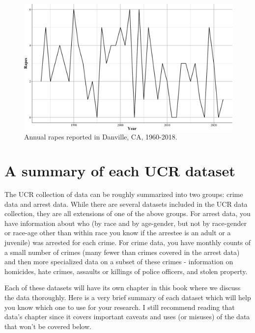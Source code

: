 \documentclass[
  12pt,
  openany]{book}
\begin{document}
\begin{figure}

{\centering \includegraphics[width=0.9\linewidth]{ucrbook_files/figure-latex/danvilleRape-1} 

}

\caption{Annual rapes reported in Danville, CA, 1960-2018.}\label{fig:danvilleRape}
\end{figure}

\hypertarget{a-summary-of-each-ucr-dataset}{%
\section{A summary of each UCR dataset}\label{a-summary-of-each-ucr-dataset}}

The UCR collection of data can be roughly summarized into two groups: crime data and arrest data. While there are several datasets included in the UCR data collection, they are all extensions of one of the above groups. For arrest data, you have information about who (by race and by age-gender, but not by race-gender or race-age other than within race you know if the arrestee is an adult or a juvenile) was arrested for each crime. For crime data, you have monthly counts of a small number of crimes (many fewer than crimes covered in the arrest data) and then more specialized data on a subset of these crimes - information on homicides, hate crimes, assaults or killings of police officers, and stolen property.

Each of these datasets will have its own chapter in this book where we discuss the data thoroughly. Here is a very brief summary of each dataset which will help you know which one to use for your research. I still recommend reading that data's chapter since it covers important caveats and uses (or misuses) of the data that won't be covered below.
\end{document}
